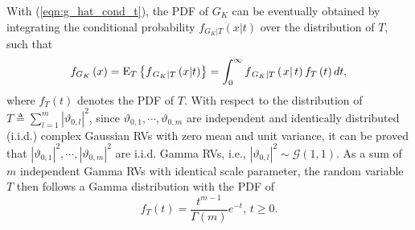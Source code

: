 \documentclass[12pt,onecolumn,draftcls]{IEEEtran}
\begin{document}
With (\ref{eqn:g_hat_cond_t}), the PDF of $G_K$ can be eventually obtained by integrating the conditional probability ${f_{\left. G_K \right|T}}\left( {\left. x \right|t} \right)$ over the distribution of $T$, such that
\begin{equation}\label{eqn_mar_G}
{{f_{G_K}}\left( x \right) = {\rm E}_{T}\left\{{f_{\left. G_K \right|T}}\left( x|t \right)\right\} = \int\nolimits_0^\infty  {{f_{\left. G_K \right|T}}\left( {\left. x \right|t} \right){f_T}\left( t \right)dt} },
\end{equation}
where ${f_T}\left( t \right)$ denotes the PDF of $T$.
With respect to the distribution of $T \triangleq \sum\nolimits_{l = 1}^m {{{\left| {\vartheta_{0,l}} \right|}^2}} $, since $\vartheta_{0,1},\cdots,\vartheta_{0,m}$ are independent and identically distributed (i.i.d.) complex Gaussian RVs with zero mean and unit variance, it can be proved that $\left|\vartheta_{0,1}\right|^2,\cdots,\left|\vartheta_{0,m}\right|^2$ are i.i.d. Gamma RVs, i.e., ${{\left| {\vartheta_{0,l}} \right|}^2} \sim \mathcal{G}\left({1,1}\right)$. As a sum of $m$ independent Gamma RVs with identical scale parameter, the random variable $T$ then follows a Gamma distribution with the PDF of \cite[p289]{degroot1986probability}
\begin{equation}\label{eqn_pdf_T_nak}
{f_T}\left( t \right) = \frac{{{t^{m - 1}}}}{{\Gamma \left( m \right)}}{e^{ - t}},\, t \ge 0.
\end{equation}
\end{document}
